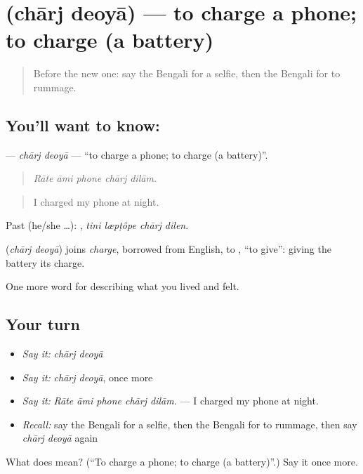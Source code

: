 \section[\texorpdfstring{\bn{চার্জ} \bn{দেওয়া} (chārj deoyā)}{চার্জ দেওয়া (chārj deoyā)}]{  (chārj deoyā) — to charge a phone; to charge (a battery)}

\label{lesson:BN-C502-charj-deoya}



\begin{quote}
Before the new one: say the Bengali for a selfie, then the Bengali for to rummage.
\end{quote}

\subsection*{You'll want to know:  }
\textbf{ } — \emph{chārj deoyā} — \textquotedblleft{}to charge a phone; to charge (a battery)\textquotedblright{}.

\begin{quote}
    
\end{quote}

\begin{quote}
\emph{Rāte āmi phone chārj dilām.}
\end{quote}

\begin{quote}
I charged my phone at night.
\end{quote}

Past (he/she …):    , \emph{tini læpṭôpe chārj dilen}.

\begin{cousinweb}
\textbf{ } (\emph{chārj deoyā}) joins \emph{charge}, borrowed from English, to , \textquotedblleft{}to give\textquotedblright{}: giving the battery its charge.
\end{cousinweb}

\begin{grammarlens}[title={What you've built}]
One more word for describing what you lived and felt.
\end{grammarlens}

\subsection*{Your turn}
\begin{itemize}
\raggedright
  \item \emph{Say it:} \emph{chārj deoyā}
  \item \emph{Say it:} \emph{chārj deoyā}, once more
  \item \emph{Say it:} \emph{Rāte āmi phone chārj dilām.} — I charged my phone at night.
  \item \emph{Recall:} say the Bengali for a selfie, then the Bengali for to rummage, then say \emph{chārj deoyā} again
\end{itemize}

\begin{tcolorbox}[breakable,colback=teal!4,colframe=teal!35!black,title={Before you move on}]
What does   mean? (\textquotedblleft{}To charge a phone; to charge (a battery)\textquotedblright{}.) Say it once more.
\end{tcolorbox}
